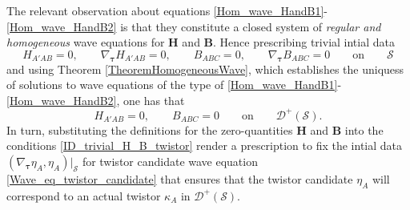 \documentclass[10pt,a4paper]{article}
\theoremstyle{plain}
\def\bmB{{\bm B}}
\def\bmH{{\bm H}}
\begin{document}
The relevant observation about equations
\eqref{Hom_wave_HandB1}-\eqref{Hom_wave_HandB2} is that they
constitute a closed system of \emph{regular and homogeneous}
wave equations for $\bmH$ and $\bmB$.
Hence prescribing trivial intial data
\[
H_{A'AB}=0, \qquad \nabla_{\bm\tau} H_{A'AB}=0, \qquad B_{ABC}=0, \qquad \nabla_{\bm\tau} B_{ABC}=0 \qquad \text{on} \qquad \mathcal{S}
\]
and using Theorem \ref{TheoremHomogeneousWave}, which establishes the
uniquess of solutions to wave equations of the type
of \eqref{Hom_wave_HandB1}-\eqref{Hom_wave_HandB2}, one has that 
\begin{equation}\label{ID_trivial_H_B_twistor}
H_{A'AB}=0, \qquad B_{ABC}=0 \qquad \text{on} \qquad \mathcal{D}^{+}(\mathcal{S}) .
\end{equation}
In turn, substituting the definitions for the zero-quantities $\bmH$
and $\bmB$ into the conditions \eqref{ID_trivial_H_B_twistor} render a
prescription to fix the intial data $(\nabla_{\bm\tau} \eta_A,
\eta_A)|_\mathcal{S}$ for  twistor
candidate wave equation \eqref{Wave_eq_twistor_candidate} that ensures that
 the twistor candidate $\eta_A$ will
correspond to an actual twistor $\kappa_A$ in $\mathcal{D}^{+}(\mathcal{S})$.
\\
\end{document}
